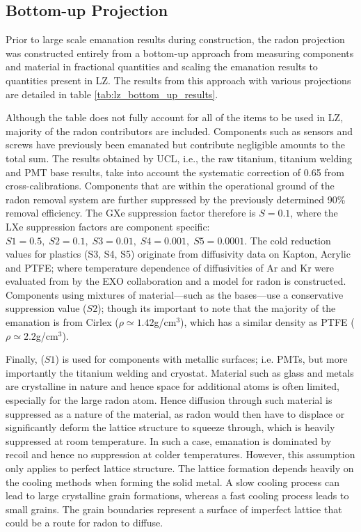 \subsection{Bottom-up Projection}

Prior to large scale emanation results during construction, the radon projection was constructed entirely from a bottom-up approach from measuring components and material in fractional quantities and scaling the emanation results to quantities present in LZ. The results from this approach with various projections are detailed in table \ref{tab:lz_bottom_up_results}.

Although the table does not fully account for all of the items to be used in LZ, majority of the radon contributors are included. Components such as sensors and screws have previously been emanated but contribute negligible amounts to the total sum. The results obtained by UCL, i.e., the raw titanium, titanium welding and PMT base results, take into account the systematic correction of 0.65 from cross-calibrations. Components that are within the operational ground of the radon removal system are further suppressed by the previously determined 90\% removal efficiency. The GXe suppression factor therefore is $S=0.1$, where the LXe suppression factors are component specific: $S1=0.5,\;S2=0.1,\;S3=0.01,\;S4=0.001,\;S5=0.0001$. The cold reduction values for plastics (S3, S4, S5) originate from diffusivity data on Kapton, Acrylic and PTFE; where temperature dependence of diffusivities of Ar and Kr were evaluated from \cite{Schowalter_2010} by the EXO collaboration and a model for radon is constructed. Components using mixtures of material---such as the bases---use a conservative suppression value ($S2$); though its important to note that the majority of the emanation is from Cirlex ($\rho{}\simeq{}1.42$g/cm$^{3}$), which has a similar density as PTFE ($\rho{}\simeq{}2.2$g/cm$^{3}$). 

Finally, ($S1$) is used for components with metallic surfaces; i.e. PMTs, but more importantly the titanium welding and cryostat. Material such as glass and metals are crystalline in nature and hence space for additional atoms is often limited, especially for the large radon atom. Hence diffusion through such material is suppressed as a nature of the material, as radon would then have to displace or significantly deform the lattice structure to squeeze through, which is heavily suppressed at room temperature. In such a case, emanation is dominated by recoil and hence no suppression at colder temperatures. However, this assumption only applies to perfect lattice structure. The lattice formation depends heavily on the cooling methods when forming the solid metal. A slow cooling process can lead to large crystalline grain formations, whereas a fast cooling process leads to small grains. The grain boundaries represent a surface of imperfect lattice that could be a route for radon to diffuse. 

